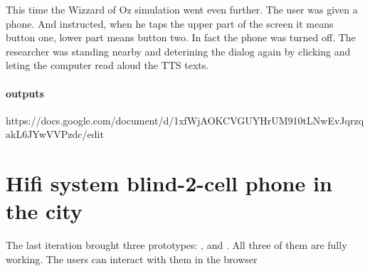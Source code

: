 	
	This time the Wizzard of Oz simulation went even further. The user was given a phone. And instructed, when he taps the upper part of the screen it means button one, lower part means button two. In fact the phone was turned off. The researcher was standing nearby and deterining the dialog again by clicking and leting the computer read aloud the TTS texts.
	
	\paragraph{outputs}
	
	https://docs.google.com/document/d/1xfWjAOKCVGUYHrUM910tLNwEvJqrzqakL6JYwVVPzdc/edit
	
	
	 
	\section{Hifi system blind-2-cell phone in the city}
	The last iteration brought three prototypes: \reversegeo, \gps and \poi. All three of them are fully working. The users can interact with them in the browser